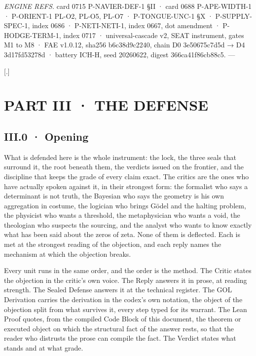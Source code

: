 \documentclass[10pt,twocolumn]{article}
\begin{document}
\emph{ENGINE REFS.} card 0715 P-NAVIER-DEF-1 §II · card 0688
P-APE-WIDTH-1 · P-ORIENT-1 PL-O2, PL-O5, PL-O7 · P-TONGUE-UNC-1 §X ·
P-SUPPLY-SPEC-1, index 0686 · P-NETI-NETI-1, index 0667, dot amendment ·
P-HODGE-TERM-1, index 0717 · universal-cascade v2, SEAT instrument,
gates M1 to M8 · FAE v1.0.12, sha256 b6c38d9c2240, chain D0 3e50675c7d5d
→ D4 3d17fd53278d · battery ICH-H, seed 20260622, digest
366ca41f86cb88c5. ---

{[}.{]}

\hypertarget{part-iii-the-defense}{%
\section{PART III · THE DEFENSE}\label{part-iii-the-defense}}

\hypertarget{iii.0-opening}{%
\subsection{III.0 · Opening}\label{iii.0-opening}}

What is defended here is the whole instrument: the lock, the three seals
that surround it, the root beneath them, the verdicts issued on the
frontier, and the discipline that keeps the grade of every claim exact.
The critics are the ones who have actually spoken against it, in their
strongest form: the formalist who says a determinant is not truth, the
Bayesian who says the geometry is his own aggregation in costume, the
logician who brings Gödel and the halting problem, the physicist who
wants a threshold, the metaphysician who wants a void, the theologian
who suspects the sourcing, and the analyst who wants to know exactly
what has been said about the zeros of zeta. None of them is deflected.
Each is met at the strongest reading of the objection, and each reply
names the mechanism at which the objection breaks.

Every unit runs in the same order, and the order is the method. The
Critic states the objection in the critic's own voice. The Reply answers
it in prose, at reading strength. The Sealed Defense answers it at the
technical register. The GOL Derivation carries the derivation in the
codex's own notation, the object of the objection split from what
survives it, every step typed for its warrant. The Lean Proof quotes,
from the compiled Code Block of this document, the theorem or executed
object on which the structural fact of the answer rests, so that the
reader who distrusts the prose can compile the fact. The Verdict states
what stands and at what grade.
\end{document}
